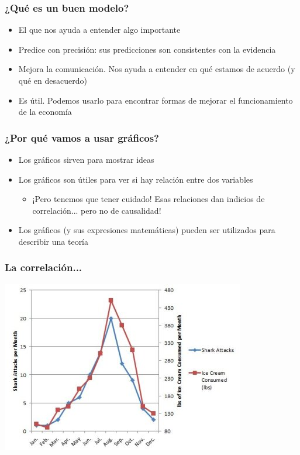 \documentclass{beamer}
\begin{document}
\begin{frame}
\frametitle{¿Qué es un buen modelo?}
\begin{itemize}
    \item El que nos ayuda a entender algo importante
    \item Predice con precisión: sus predicciones son consistentes con la evidencia \vspace{1mm}
    \item Mejora la comunicación. Nos ayuda a entender en qué estamos de acuerdo (y qué en desacuerdo) \vspace{1mm}
    \item Es útil. Podemos usarlo para encontrar formas de mejorar el funcionamiento de la economía
\end{itemize} 
\end{frame}


\begin{frame}
\frametitle{¿Por qué vamos a usar gráficos?}
\begin{itemize}
    \item Los gráficos sirven para mostrar ideas \vspace{2mm}
    \item Los gráficos son útiles para ver si hay relación entre dos variables 
     \begin{itemize}
        \item ¡Pero tenemos que tener cuidado! Esas relaciones dan indicios de correlación... pero no de causalidad! \vspace{2mm}
    \end{itemize}
    \item Los gráficos (y sus expresiones matemáticas) pueden ser utilizados para describir una teoría
\end{itemize} 
\end{frame}

\begin{frame}
\frametitle{La correlación...}
\begin{center}
    \includegraphics[scale=0.55]{../Figures/Introduccion_1.5_ovbias.jpg}
\end{center}
\end{frame}
\end{document}
